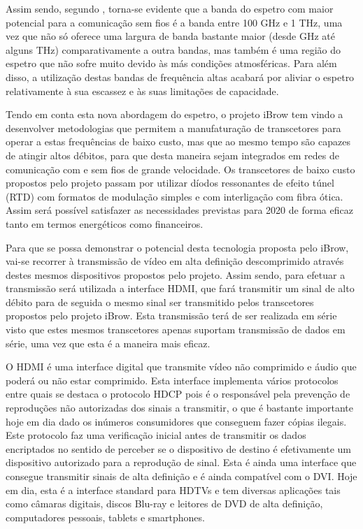 Assim sendo, segundo \cite{R005}, torna-se evidente que a banda do espetro com maior potencial para a comunicação sem fios é a banda entre 100 GHz e 1 THz, uma vez que não só oferece uma largura de banda bastante maior (desde GHz até alguns THz) comparativamente a outra bandas, mas também é uma região do espetro que não sofre muito devido às más condições atmosféricas. Para além disso, a utilização destas bandas de frequência altas acabará por aliviar o espetro relativamente à sua escassez e às suas limitações de capacidade. 

Tendo em conta esta nova abordagem do espetro, o projeto iBrow tem vindo a desenvolver metodologias que permitem a manufaturação de transcetores para operar a estas frequências de baixo custo, mas que ao mesmo tempo são capazes de atingir altos débitos, para que desta maneira sejam integrados em redes de comunicação com e sem fios de grande velocidade. Os transcetores de baixo custo propostos pelo projeto passam por utilizar díodos ressonantes de efeito túnel (RTD) com formatos de modulação simples e com interligação com fibra ótica. Assim será possível satisfazer as necessidades previstas para 2020 de forma eficaz tanto em termos energéticos como financeiros.

Para que se possa demonstrar o potencial desta tecnologia proposta pelo iBrow, vai-se recorrer à transmissão de vídeo em alta definição descomprimido através destes mesmos dispositivos propostos pelo projeto. Assim sendo, para efetuar a transmissão será utilizada a interface HDMI, que fará transmitir um sinal de alto débito para de seguida o mesmo sinal ser transmitido pelos transcetores propostos pelo projeto iBrow. Esta transmissão terá de ser realizada em série visto que estes mesmos transcetores apenas suportam transmissão de dados em série, uma vez que esta é a maneira mais eficaz.

O HDMI é uma interface digital que transmite vídeo não comprimido e áudio que poderá ou não estar comprimido. Esta interface implementa vários protocolos entre quais se destaca o protocolo HDCP pois é o responsável pela prevenção de reproduções não autorizadas dos sinais a transmitir, o que é bastante importante hoje em dia dado os inúmeros consumidores que conseguem fazer cópias ilegais. Este protocolo faz uma verificação inicial antes de transmitir os dados encriptados no sentido de perceber se o dispositivo de destino é efetivamente um dispositivo autorizado para a reprodução de sinal. Esta é ainda uma interface que consegue transmitir sinais de alta definição e é ainda compatível com o DVI. Hoje em dia, esta é a interface standard para HDTVs e tem diversas aplicações tais como câmaras digitais, discos Blu-ray e leitores de DVD de alta definição, computadores pessoais, tablets e smartphones.

